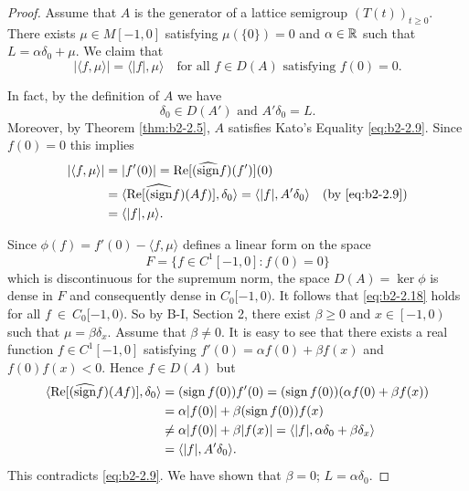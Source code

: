 \begin{proof}
Assume that $A$ is the generator of a lattice semigroup $(T(t))_{t \geq 0}$.
There exists $\mu \in M[-1,0]$ satisfying $\mu(\{0\}) = 0$ and $\alpha \in \mathbb{R}$ such that $L = \alpha\delta_{0} + \mu$.
We claim that
\begin{equation}\label{eq:b2-2.18}
|\langle f,\mu \rangle| = \langle |f|,\mu \rangle \quad \text{for all } f \in D(A) \text{ satisfying } f(0) = 0.
\end{equation}

In fact, by the definition of $A$ we have
\begin{equation}\label{eq:b2-2.19}
\delta_{0} \in D(A') \text{ and } A'\delta_{0} = L.
\end{equation}
Moreover, by Theorem \ref{thm:b2-2.5}, $A$ satisfies Kato's Equality \eqref{eq:b2-2.9}.
Since $f(0) = 0$ this implies
\begin{align*}
|\langle f,\mu \rangle| &= |f'(0)| = \mathop{}\!\mathrm{Re}[(\widehat{\operatorname{sign}} f)(f')](0) \\
&= \langle \mathop{}\!\mathrm{Re}[\widehat{(\operatorname{sign}} f)(Af)],\delta_{0} \rangle = \langle |f|,A'\delta_{0} \rangle \quad \text{(by \eqref{eq:b2-2.9})} \\
&= \langle |f|,\mu \rangle.
\end{align*}

Since $\phi(f) = f'(0) - \langle f,\mu \rangle$ defines a linear form on the space 
\[
F = \{f \in C^{1}[-1,0] \colon f(0) = 0\}
\]
 which is discontinuous for the supremum norm, the space $D(A) = \ker \phi$ is dense in $F$ and consequently dense in $C_{0}[-1,0)$.
It follows that \eqref{eq:b2-2.18} holds for all $f~\in~C_{0}[-1,0)$.
So by B-I, Section 2, there exist $\beta \geq 0$ and $x \in \left[-1,0\right)$ such that $\mu = \beta\delta_{x}$.
Assume that $\beta \neq 0$.
It is easy to see that there exists a real function $f \in C^{1}[-1,0]$ satisfying $f'(0) = \alpha f(0) + \beta f(x)$ and $f(0)f(x) < 0$.
Hence $f \in D(A)$ but 
\begin{align*}
\langle \mathop{}\!\mathrm{Re}[(\widehat{\operatorname{sign}} f)(Af)],\delta_{0} \rangle 
	&= (\operatorname{sign} f(0))f'(0) 
	= (\operatorname{sign} f(0))(\alpha f(0) + \beta f(x))\\
	&= \alpha|f(0)| + \beta(\operatorname{sign} f(0))f(x) \\
	&\neq \alpha|f(0)| + \beta|f(x)| 
	= \langle |f|, \alpha\delta_{0} + \beta\delta_{x} \rangle \\ 
	&= \langle |f|,A'\delta_{0} \rangle.
\end{align*}
This contradicts \eqref{eq:b2-2.9}.
We have shown that $\beta = 0$; \ie  $L = \alpha\delta_{0}$.


\end{proof}
